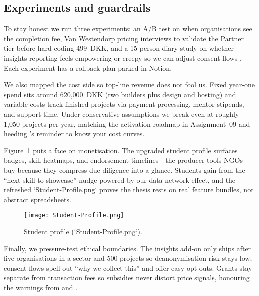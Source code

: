 \subsection*{Experiments and guardrails}
To stay honest we run three experiments: an A/B test on when organisations see the completion fee, Van Westendorp pricing interviews to validate the Partner tier before hard-coding 499~DKK, and a 15-person diary study on whether insights reporting feels empowering or creepy so we can adjust consent flows \citep{Reillier2017}. Each experiment has a rollback plan parked in Notion.

We also mapped the cost side so top-line revenue does not fool us. Fixed year-one spend sits around 620,000~DKK (two builders plus design and hosting) and variable costs track finished projects via payment processing, mentor stipends, and support time. Under conservative assumptions we break even at roughly 1,050 projects per year, matching the activation roadmap in Assignment~09 and heeding \citet{ShapiroVarian1999}'s reminder to know your cost curves.

Figure~\ref{fig:student-profile} puts a face on monetisation. The upgraded student profile surfaces badges, skill heatmaps, and endorsement timelines---the producer tools NGOs buy because they compress due diligence into a glance. Students gain from the ``next skill to showcase'' nudge powered by our data network effect, and the refreshed `Student-Profile.png` proves the thesis rests on real feature bundles, not abstract spreadsheets.

\begin{figure}[h]
  \centering
  \texttt{[image: Student-Profile.png]}
  \caption{Student profile (`Student-Profile.png`).}
  \label{fig:student-profile}
\end{figure}

Finally, we pressure-test ethical boundaries. The insights add-on only ships after five organisations in a sector and 500 projects so deanonymisation risk stays low; consent flows spell out ``why we collect this'' and offer easy opt-outs. Grants stay separate from transaction fees so subsidies never distort price signals, honouring the warnings from \citet{Zuboff2019} and \citet{Srnicek2017}.
